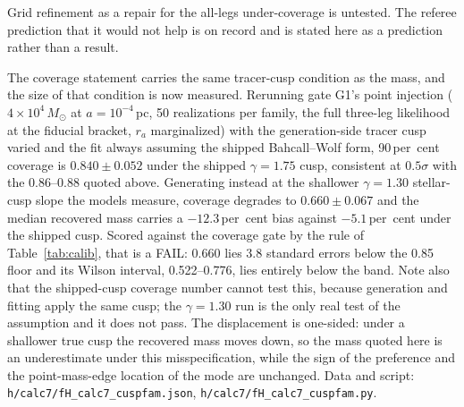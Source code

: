 \documentclass[11pt]{article}
\newcommand{\msun}{\ensuremath{M_\odot}}
\begin{document}
Grid refinement as a repair for the all-legs under-coverage is untested. The referee prediction
that it would not help is on record and is stated here as a prediction rather than a result.

The coverage statement carries the same tracer-cusp condition as the mass, and the size of that condition is now measured. Rerunning gate G1's point injection ($4\times10^{4}\,\msun$ at $a = 10^{-4}$\,pc, 50 realizations per family, the full three-leg likelihood at the fiducial bracket, $r_a$ marginalized) with the generation-side tracer cusp varied and the fit always assuming the shipped Bahcall--Wolf form, 90\,per~cent coverage is $0.840 \pm 0.052$ under the shipped $\gamma = 1.75$ cusp, consistent at $0.5\sigma$ with the 0.86--0.88 quoted above. Generating instead at the shallower $\gamma = 1.30$ stellar-cusp slope the \citet{GonzalezPrieto2025} models measure, coverage degrades to $0.660 \pm 0.067$ and the median recovered mass carries a $-12.3$\,per~cent bias against $-5.1$\,per~cent under the shipped cusp. Scored against the coverage gate by the rule of Table~\ref{tab:calib}, that is a FAIL: 0.660 lies $3.8$ standard errors below the 0.85 floor and its Wilson interval, 0.522--0.776, lies entirely below the band. Note also that the shipped-cusp coverage number cannot test this, because generation and fitting apply the same cusp; the $\gamma = 1.30$ run is the only real test of the assumption and it does not pass. The displacement is one-sided: under a shallower true cusp the recovered mass moves down, so the mass quoted here is an underestimate under this misspecification, while the sign of the preference and the point-mass-edge location of the mode are unchanged. Data and script: \texttt{h/calc7/fH\_calc7\_cuspfam.json}, \texttt{h/calc7/fH\_calc7\_cuspfam.py}.
\end{document}
